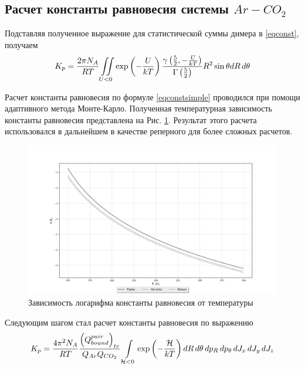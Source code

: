 \subsection{Расчет константы равновесия системы $Ar-CO_2$}

Подставляя полученное выражение для статистической суммы димера в \eqref{eqconst}, получаем
\vverh
\begin{gather}
	K_p = \frac{2 \pi N_A}{R T} \iint\limits_{U < 0} \exp \left( - \frac{U}{k T} \right) \frac{\gamma \left( \frac{5}{2}, - \frac{U}{kT} \right)}{\Gamma \left( \frac{5}{2} \right)} R^2 \sin \theta d R \, d \theta \label{eqconstsimple}
\end{gather}

Расчет константы равновесия по формуле \eqref{eqconstsimple} проводился при помощи адаптивного метода Монте-Карло. Полученная температурная зависимость константы равновесия представлена на  Рис. \ref{fig:pic3}. Результат этого расчета использовался в дальнейшем в качестве реперного для более сложных расчетов. 
\vverh
\begin{figure}[!ht]
	\hspace*{-1.2cm}
	\includegraphics[width=1.1\textwidth]{pictures/all_eq_const.png}
	\caption{Зависимость логарифма константы равновесия от температуры}
	\label{fig:pic3}
\end{figure}

Следующим шагом стал расчет константы равновесия по выражению
\vverh
\begin{gather}
	K_p = \frac{4 \pi^2 N_A}{RT} \frac{ \left( Q_{bound}^{pair} \right)_{tr}}{Q_{Ar} Q_{CO_2}} \int\limits_{\mathcal{H} < 0} \exp \left( - \frac{\mathcal{H}}{k T} \right) d R \, d \theta \, d p_R \, d p_\theta \, d J_x \, d J_y \, d J_z \label{eqconstdim} 
\end{gather}


